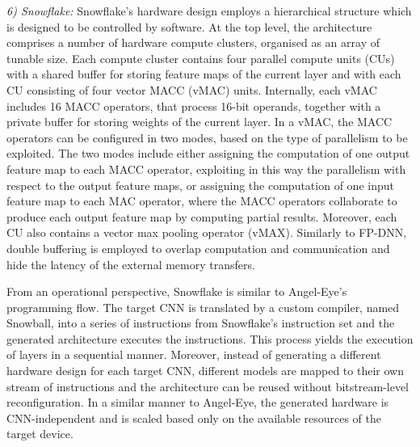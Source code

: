 \documentclass[format=acmsmall, review=false, screen=true]{acmart}
\begin{document}
{\color{black}\textit{6) Snowflake:} 
Snowflake's hardware design employs a hierarchical structure which is designed to be controlled by software. At the top level, the architecture comprises a number of hardware compute clusters, organised as an array of tunable size. Each compute cluster contains four parallel compute units (CUs) with a shared buffer for storing feature maps of the current layer and with each CU consisting of four vector MACC (vMAC) units. Internally, each vMAC includes 16 MACC operators, that process 16-bit operands, together with a private buffer for storing weights of the current layer. In a vMAC, the MACC operators can be configured in two modes, based on the type of parallelism to be exploited. The two modes include either assigning the computation of one output feature map to each MACC operator, exploiting in this way the parallelism with respect to the output feature maps, or assigning the computation of one input feature map to each MAC operator, where the MACC operators collaborate to produce each output feature map by computing partial results. Moreover, each CU also contains a vector max pooling operator (vMAX). Similarly to FP-DNN, double buffering is employed to overlap computation and communication and hide the latency of the external memory transfers.

From an operational perspective, Snowflake is similar to Angel-Eye's programming flow. The target CNN is translated by a custom compiler, named Snowball, into a series of instructions from Snowflake's instruction set and the generated architecture executes the instructions. This process yields the execution of layers in a sequential manner. Moreover, instead of generating a different hardware design for each target CNN, different models are mapped to their own stream of instructions and the architecture can be reused without bitstream-level reconfiguration. In a similar manner to Angel-Eye, the generated hardware is CNN-independent and is scaled based only on the available resources of the target device.

}
\end{document}
